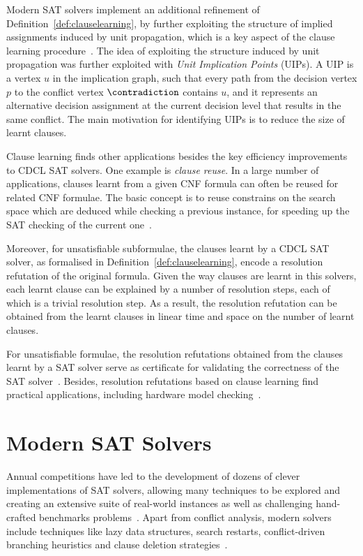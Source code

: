 Modern SAT solvers implement an additional refinement of
Definition~\ref{def:clauselearning}, by further exploiting the structure of
implied assignments induced by unit propagation, which is a key aspect of the
clause learning procedure~\cite{silva1997grasp}. The idea of exploiting the
structure induced by unit propagation was further exploited with \emph{Unit
Implication Points} (UIPs). A UIP is a vertex $u$ in the implication graph, such
that every path from the decision vertex $p$ to the conflict vertex $\contradiction$
contains $u$, and it represents an alternative decision assignment at the
current decision level that results in the same conflict. The main motivation
for identifying UIPs is to reduce the size of learnt clauses. 

Clause learning finds other applications besides the key efficiency improvements
to CDCL SAT solvers. One example is \emph{clause reuse}. In a large number of
applications, clauses learnt from a given CNF formula can often be reused for
related CNF formulae. The basic concept is to reuse constrains on the search
space which are deduced while checking a previous instance, for speeding up the
SAT checking of the current one~\cite{shtrichman2001pruning}.

Moreover, for unsatisfiable subformulae, the clauses learnt by a CDCL SAT
solver, as formalised in Definition~\ref{def:clauselearning}, encode a
resolution refutation of the original formula. Given the way clauses are learnt
in this solvers, each learnt clause can be explained by a number of resolution
steps, each of which is a trivial resolution step. As a result, the resolution
refutation can be obtained from the learnt clauses in linear time and space on
the number of learnt clauses. 

For unsatisfiable formulae, the resolution refutations obtained from the clauses
learnt by a SAT solver serve as certificate for validating the correctness of
the SAT solver~\cite{cdclchapter}. Besides, resolution refutations based on
clause learning find practical applications, including hardware model
checking~\cite{mcmillan2003interpolation}.

\section{Modern SAT Solvers}%
\label{sec:modern}

Annual competitions have led to the development of dozens of clever
implementations of SAT solvers, allowing many techniques to be explored and
creating an extensive suite of real-world instances as well as challenging
hand-crafted benchmarks problems~\cite{satchapter}. Apart from conflict
analysis, modern solvers include techniques like lazy data structures, search
restarts, conflict-driven branching heuristics and clause deletion
strategies~\cite{cdclchapter}.  

